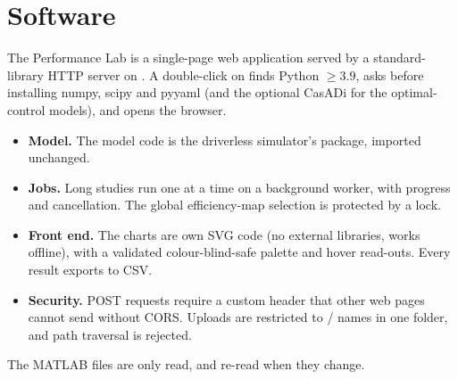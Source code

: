 \documentclass[11pt]{article}
\begin{document}
\section{Software}\label{sec:software}
The Performance Lab is a single-page web application served by a standard-library HTTP server on
. A double-click on  finds Python $\ge3.9$, asks before installing numpy,
scipy and pyyaml (and the optional CasADi for the optimal-control models), and opens the browser.
\begin{itemize}
  \item \textbf{Model.} The model code is the driverless simulator's  package, imported
        unchanged.
  \item \textbf{Jobs.} Long studies run one at a time on a background worker, with progress and cancellation.
        The global efficiency-map selection is protected by a lock.
  \item \textbf{Front end.} The charts are own SVG code (no external libraries, works offline), with a validated
        colour-blind-safe palette and hover read-outs. Every result exports to CSV.
  \item \textbf{Security.} POST requests require a custom header that other web pages cannot send without CORS.
        Uploads are restricted to / names in one folder, and path traversal is rejected.
\end{itemize}
The MATLAB files are only read, and re-read when they change.

\end{document}
